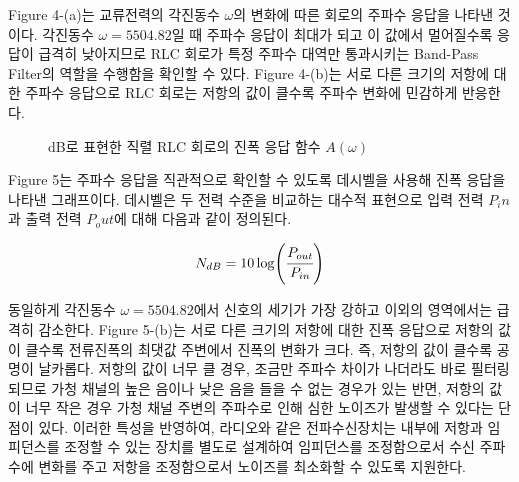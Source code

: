 \documentclass{article}
\begin{document}
Figure 4-(a)는 교류전력의 각진동수 $\omega$의 변화에 따른 회로의 주파수 응답을 나타낸 것이다. 각진동수 $\omega=5504.82$일 때 주파수 응답이 최대가 되고 이 값에서 멀어질수록 응답이 급격히 낮아지므로 RLC 회로가 특정 주파수 대역만 통과시키는 Band-Pass Filter의 역할을 수행함을 확인할 수 있다. Figure 4-(b)는 서로 다른 크기의 저항에 대한 주파수 응답으로 RLC 회로는 저항의 값이 클수록 주파수 변화에 민감하게 반응한다.

\begin{figure}[h]
    \centering
    \caption{dB로 표현한 직렬 RLC 회로의 진폭 응답 함수 $A(\omega)$}
\end{figure}

Figure 5는 주파수 응답을 직관적으로 확인할 수 있도록 데시벨을 사용해 진폭 응답을 나타낸 그래프이다. 데시벨은 두 전력 수준을 비교하는 대수적 표현으로 입력 전력 $P_in$과 출력 전력 $P_out$에 대해 다음과 같이 정의된다.

\begin{equation}
    N_{dB}=10\log(\cfrac{P_{out}}{P_{in}})
\end{equation}

동일하게 각진동수  $\omega=5504.82$에서 신호의 세기가 가장 강하고 이외의 영역에서는 급격히 감소한다. Figure 5-(b)는 서로 다른 크기의 저항에 대한 진폭 응답으로 저항의 값이 클수록 전류진폭의 최댓값 주변에서 진폭의 변화가 크다. 즉, 저항의 값이 클수록 공명이 날카롭다. 저항의 값이 너무 클 경우, 조금만 주파수 차이가 나더라도 바로 필터링되므로 가청 채널의 높은 음이나 낮은 음을 들을 수 없는 경우가 있는 반면, 저항의 값이 너무 작은 경우 가청 채널 주변의 주파수로 인해 심한 노이즈가 발생할 수 있다는 단점이 있다. 이러한 특성을 반영하여, 라디오와 같은 전파수신장치는 내부에 저항과 임피던스를 조정할 수 있는 장치를 별도로 설계하여 임피던스를 조정함으로서 수신 주파수에 변화를 주고 저항을 조정함으로서 노이즈를 최소화할 수 있도록 지원한다.
\end{document}
